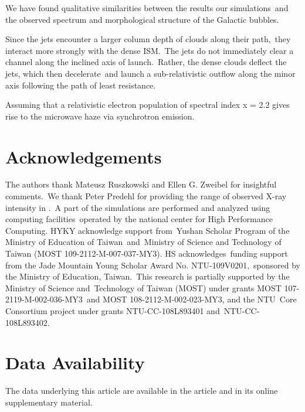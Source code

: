 \documentclass[twocolumn]{aastex631}
\begin{document}
We have found qualitative similarities between the results our simulations\
and the observed spectrum and morphological structure of the Galactic bubbles.


Since the jets encounter a larger column depth of clouds along their path,\
they interact more strongly with the dense ISM.\
The jets do not immediately clear a channel along the inclined axis of launch.\
Rather, the dense clouds deflect the jets, which then decelerate\
and launch a sub-relativistic outflow along the minor axis following the path of least resistance.

Assuming that a relativistic electron population of spectral
index x = 2.2 gives rise to the microwave haze via synchrotron
emission.




\section{Acknowledgements}
The authors thank Mateusz Ruszkowski and Ellen G. Zweibel for insightful comments.\
We thank Peter Predehl for providing the range of observed X-ray intensity in .\
A part of the simulations are performed and analyzed using computing facilities\
operated by the national center for High Performance Computing.
HYKY acknowledge support from\
Yushan Scholar Program of the Ministry of Education of Taiwan\
and\
Ministry of Science and Technology of Taiwan (MOST 109-2112-M-007-037-MY3).
HS acknowledges\
funding support from the Jade Mountain Young Scholar Award No. NTU-109V0201,\
sponsored by the Ministry of Education, Taiwan.\
This research is partially supported by the Ministry of Science and\
Technology of Taiwan (MOST) under grants MOST 107-2119-M-002-036-MY3\
and MOST 108-2112-M-002-023-MY3, and the NTU\
Core Consortium project under grants NTU-CC-108L893401 and\
NTU-CC-108L893402.

\section*{Data Availability}
The data underlying this article are available in the article and in its online supplementary material.






\end{document}
